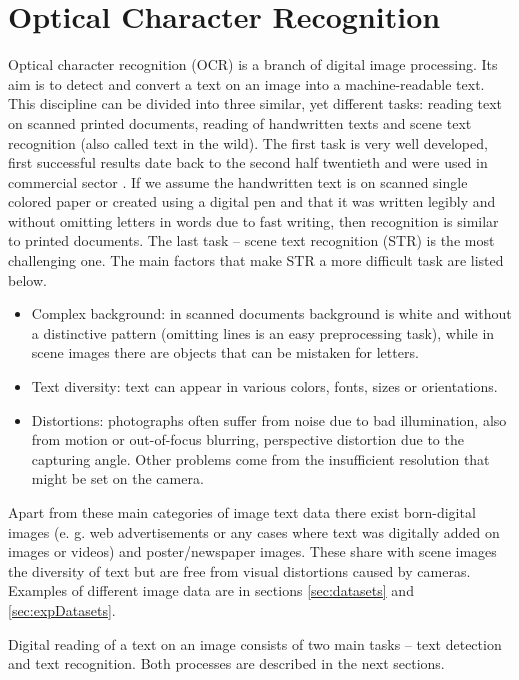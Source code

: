 \chapter{Optical Character Recognition}
\label{ch:OCR}

Optical character recognition (OCR) is a branch of digital image processing. Its aim is to detect and convert a text on an image into a machine-readable text. This discipline can be divided into three similar, yet different tasks: reading text on scanned printed documents, reading of handwritten texts and scene text recognition (also called text in the wild). The first task is very well developed, first successful results date back to the second half twentieth and were used in commercial sector \cite{ocrhist}. If we assume the handwritten text is on scanned single colored paper or created using a digital pen and that it was written legibly and without omitting letters in words due to fast writing, then recognition is similar to printed documents. The last task -- scene text recognition (STR) is the most challenging one. 
The main factors that make STR a more difficult task are listed below.\cite{chen2021text, raisi2020text}

\begin{itemize}
    \item Complex background: in scanned documents background is white and without  a distinctive pattern (omitting lines is an easy preprocessing task), while in scene images there are objects that can be mistaken for letters.
    \item Text diversity: text can appear in various colors, fonts, sizes or orientations.
    \item Distortions: photographs often suffer from noise due to bad illumination, also from motion or out-of-focus blurring, perspective distortion due to the capturing angle. Other problems come from the insufficient resolution that might be set on the camera.
\end{itemize}

Apart from these main categories of image text data there exist born-digital images (e. g. web advertisements or any cases where text was digitally added on images or videos) and poster/newspaper images. These share with scene images the diversity of text but are free from visual distortions caused by cameras. Examples of different image data are in sections \ref*{sec:datasets} and \ref*{sec:expDatasets}. 

Digital reading of a text on an image consists of two main tasks -- text detection and text recognition. Both processes are described in the next sections.

